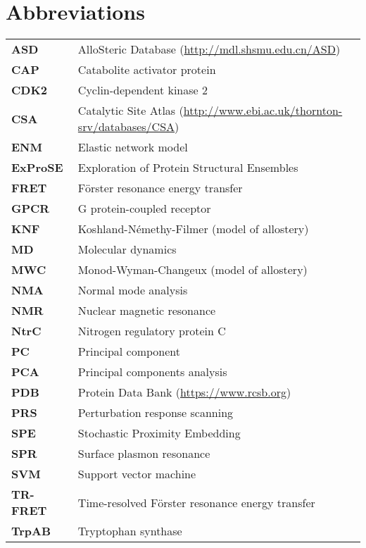 \chapter*{Abbreviations}

\begin{tabular}{ >{\bfseries}l l }
ASD      &  AlloSteric Database (\url{http://mdl.shsmu.edu.cn/ASD}) \\
CAP      &  Catabolite activator protein \\
CDK2     &  Cyclin-dependent kinase 2 \\
CSA      &  Catalytic Site Atlas (\url{http://www.ebi.ac.uk/thornton-srv/databases/CSA}) \\
ENM      &  Elastic network model \\
ExProSE  &  Exploration of Protein Structural Ensembles \\
FRET     &  F\"{o}rster resonance energy transfer \\
GPCR     &  G protein-coupled receptor \\
KNF      &  Koshland-N\'{e}methy-Filmer (model of allostery) \\
MD       &  Molecular dynamics \\
MWC      &  Monod-Wyman-Changeux (model of allostery) \\
NMA      &  Normal mode analysis \\
NMR      &  Nuclear magnetic resonance \\
NtrC     &  Nitrogen regulatory protein C \\
PC       &  Principal component \\
PCA      &  Principal components analysis \\
PDB      &  Protein Data Bank (\url{https://www.rcsb.org}) \\
PRS      &  Perturbation response scanning \\
SPE      &  Stochastic Proximity Embedding \\
SPR      &  Surface plasmon resonance \\
SVM      &  Support vector machine \\
TR-FRET  &  Time-resolved F\"{o}rster resonance energy transfer \\
TrpAB    &  Tryptophan synthase \\
\end{tabular}
